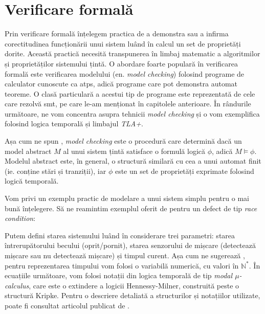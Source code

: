 \section{Verificare formală}

Prin verificare formală înțelegem practica de a demonstra sau a infirma corectitudinea funcționării unui sistem luând în calcul un set de proprietăți dorite. Această practică necesită transpunerea în limbaj matematic a algoritmilor și proprietăților sistemului țintă. O abordare foarte populară în verificarea formală este verificarea modelului (en. \textit{model checking}) folosind programe de calculator cunoscute ca \acrfull{atps}, adică programe care pot demonstra automat teoreme. O clasă particulară a acestui tip de programe este reprezentată de cele care rezolvă \acrfull{smt}, pe care le-am menționat în capitolele anterioare. În rândurile următoare, ne vom concentra asupra tehnicii \textit{model checking} și o vom exemplifica folosind logica temporală și limbajul \textit{TLA+}.

Așa cum ne spun \citet{Markus1999}, \textit{model checking} este o procedură care determină dacă un model abstract $M$ al unui sistem țintă satisface o formulă logică $\phi$, adică $M \models \phi$. Modelul abstract este, în general, o structură similară cu cea a unui automat finit (ie. conține stări și tranziții), iar $\phi$ este un set de proprietăți exprimate folosind logică temporală.

Vom privi un exemplu practic de modelare a unui sistem simplu pentru o mai bună înțelegere. Să ne reamintim exemplul oferit de \citet{Zhou2021} pentru un defect de tip \textit{race condition}:


Putem defini starea sistemului luând în considerare trei parametri: starea întrerupătorului becului (oprit/pornit), starea senzorului de mișcare (detectează mișcare sau nu detectează mișcare) și timpul curent. Așa cum ne sugerează \citet{Lamport2005}, pentru reprezentarea timpului vom folosi o variabilă numerică, cu valori în $\mathbb{N}^*$. În ecuațiile următoare, vom folosi notații din logica temporală de tip \textit{modal $\mu$-calculus}, care este o extindere a logicii Hennessy-Milner, construită peste o structură Kripke. Pentru o descriere detaliată a structurilor și notațiilor utilizate, poate fi consultat articolul publicat de \citet{Markus1999}.

